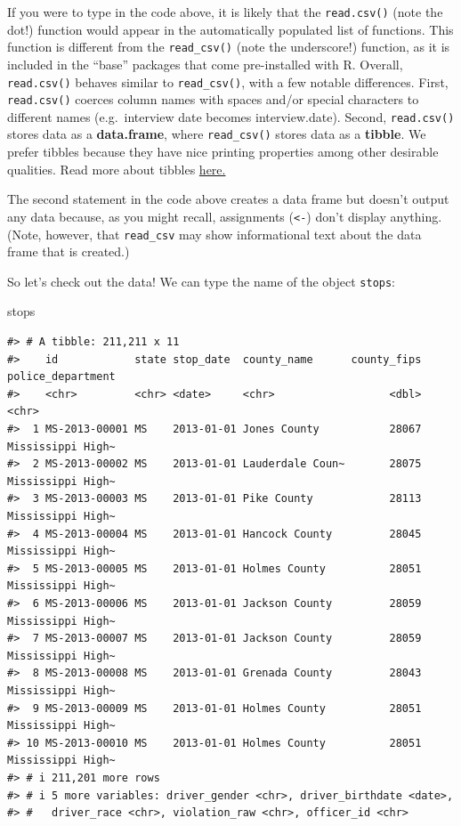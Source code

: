 \documentclass[
]{book}
\newenvironment{Shaded}{\begin{snugshade}}{\end{snugshade}}
\newcommand{\NormalTok}[1]{#1}
\begin{document}
If you were to type in the code above, it is likely that the \texttt{read.csv()} (note the dot!) function would appear in the automatically populated list of functions. This function is different from the \texttt{read\_csv()} (note the underscore!) function, as it is included in the ``base'' packages that come pre-installed with R. Overall, \texttt{read.csv()} behaves similar to \texttt{read\_csv()}, with a few notable differences. First, \texttt{read.csv()} coerces column names with spaces and/or special characters to different names (e.g.~interview date becomes interview.date). Second, \texttt{read.csv()} stores data as a \textbf{data.frame}, where \texttt{read\_csv()} stores data as a \textbf{tibble}. We prefer tibbles because they have nice printing properties among other desirable qualities. Read more about tibbles \href{https://tibble.tidyverse.org/}{here.}

The second statement in the code above creates a data frame but doesn't output any data because, as you might recall, assignments (\texttt{\textless{}-}) don't display anything. (Note, however, that \texttt{read\_csv} may show informational text about the data frame that is created.)

So let's check out the data! We can type the name of the object \texttt{stops}:

\begin{Shaded}
\begin{Highlighting}[]
\NormalTok{stops}
\end{Highlighting}
\end{Shaded}

\begin{verbatim}
#> # A tibble: 211,211 x 11
#>    id            state stop_date  county_name      county_fips police_department
#>    <chr>         <chr> <date>     <chr>                  <dbl> <chr>            
#>  1 MS-2013-00001 MS    2013-01-01 Jones County           28067 Mississippi High~
#>  2 MS-2013-00002 MS    2013-01-01 Lauderdale Coun~       28075 Mississippi High~
#>  3 MS-2013-00003 MS    2013-01-01 Pike County            28113 Mississippi High~
#>  4 MS-2013-00004 MS    2013-01-01 Hancock County         28045 Mississippi High~
#>  5 MS-2013-00005 MS    2013-01-01 Holmes County          28051 Mississippi High~
#>  6 MS-2013-00006 MS    2013-01-01 Jackson County         28059 Mississippi High~
#>  7 MS-2013-00007 MS    2013-01-01 Jackson County         28059 Mississippi High~
#>  8 MS-2013-00008 MS    2013-01-01 Grenada County         28043 Mississippi High~
#>  9 MS-2013-00009 MS    2013-01-01 Holmes County          28051 Mississippi High~
#> 10 MS-2013-00010 MS    2013-01-01 Holmes County          28051 Mississippi High~
#> # i 211,201 more rows
#> # i 5 more variables: driver_gender <chr>, driver_birthdate <date>,
#> #   driver_race <chr>, violation_raw <chr>, officer_id <chr>
\end{verbatim}
\end{document}

